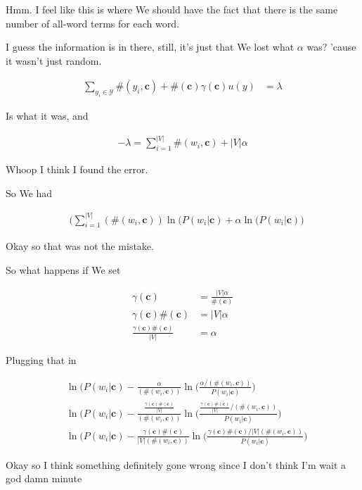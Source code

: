 \documentclass{article}
\newcommand{\context}{\boldsymbol{c}}
\begin{document}
		Hmm. I feel like this is where We should have the fact that there is the same number of all-word terms for each word. 
		
		I guess the information is in there, still, it's just that We lost what $\alpha$ was? 'cause it wasn't just random. 
		
		\begin{align}
			\sum_{y_i\in\mathcal{Y}} \#(y_i, \context) +\#(\context)\gamma(\context)u(y) &= \lambda
		\end{align}
		
		Is what it was, and
		
		\begin{align}
			-\lambda = \sum^{|V|}_{i=1} \#(w_i, \context) + |V|\alpha
		\end{align}
		
		Whoop I think I found the error.
		
		So We had
		
		\begin{align}
			& \bigg( \sum^{|V|}_{i=1} (\#(w_i, \context) )\ln(P(w_i|\context) + \alpha\ln(P(w_i|\context)\bigg) 
		\end{align}
		
		Okay so that was not the mistake.
		
		So what happens if We set 
		
		\begin{align}
			\gamma(\context) &= \frac{|V|\alpha}{\#(\context)}\\
			\gamma(\context)\#(\context) &= |V|\alpha\\
			\frac{\gamma(\context)\#(\context)}{|V|} &= \alpha
		\end{align}
		
		Plugging that in
		
		\begin{align}
			& \ln(P(w_i|\context) - \frac{\alpha}{(\#(w_i, \context) )}\ln\bigg(\frac{\alpha/(\#(w_i, \context) )}{P(w_i|\context)}\bigg) \\
			& \ln(P(w_i|\context) - \frac{\frac{\gamma(\context)\#(\context)}{|V|}}{(\#(w_i, \context) )}\ln\bigg(\frac{\frac{\gamma(\context)\#(\context)}{|V|}/(\#(w_i, \context) )}{P(w_i|\context)}\bigg) \\
			& \ln(P(w_i|\context) - \frac{\gamma(\context)\#(\context)}{|V|(\#(w_i, \context) )}\ln\bigg(\frac{\gamma(\context)\#(\context)/|V|(\#(w_i, \context) )}{P(w_i|\context)}\bigg) 
		\end{align}
		
		Okay so I think something definitely gone wrong since I don't think I'm wait a god damn minute
		
\end{document}
